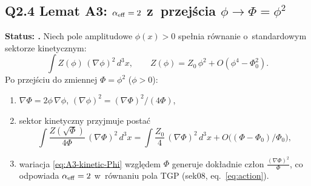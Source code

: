 \subsection*{Q2.4 Lemat A3: $\alpha_{\rm eff} = 2$ z~przej\'scia $\phi \to \Phi = \phi^2$}
\label{ssec:lemma-A3}

\begin{lemma}[$\alpha_{\rm eff} = 2$ z~geometrii zmiennej --- Lemat A3]%
\label{lem:A3-alpha-eff}
\textbf{Status: .}
Niech pole amplitudowe $\phi(x) > 0$ spe\l{}nia r\'ownanie o~standardowym
sektorze kinetycznym:
\begin{equation}
  \int Z(\phi)\,(\nabla\phi)^2\,d^3x,
  \qquad Z(\phi) = Z_0\,\phi^2 + O(\phi^4 - \Phi_0^2).
  \label{eq:A3-kinetic-phi}
\end{equation}
Po przej\'sciu do zmiennej $\Phi = \phi^2$ ($\phi > 0$):
\begin{enumerate}[nosep]
  \item[(i)] $\nabla\Phi = 2\phi\,\nabla\phi$,
    \quad $(\nabla\phi)^2 = (\nabla\Phi)^2/(4\Phi)$,
  \item[(ii)] sektor kinetyczny przyjmuje posta\'c
    \begin{equation}
      \int \frac{Z(\sqrt{\Phi})}{4\Phi}\,(\nabla\Phi)^2\,d^3x
      = \int \frac{Z_0}{4}\,(\nabla\Phi)^2\,d^3x
        + O\bigl((\Phi - \Phi_0)/\Phi_0\bigr),
      \label{eq:A3-kinetic-Phi}
    \end{equation}
  \item[(iii)] wariacja \eqref{eq:A3-kinetic-Phi} wzgl\k{e}dem $\Phi$
    generuje dok\l{}adnie cz\l{}on
    $\frac{(\nabla\Phi)^2}{\Phi}$,
    co odpowiada $\alpha_{\rm eff} = 2$
    w~r\'ownaniu pola TGP (sek08, eq.~\eqref{eq:action}).
\end{enumerate}
\end{lemma}

